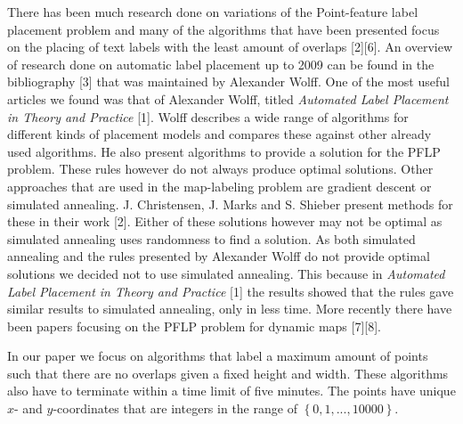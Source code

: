 \documentclass[crop=false,a4paper,oneside,11pt]{standalone}
\begin{document}
 There has been much research done on variations of the Point-feature label placement problem and many of the algorithms that have been presented focus on the placing of text labels with the least amount of overlaps [2][6]. An overview of research done on automatic label placement up to 2009 can be found in the bibliography [3] that was maintained by Alexander Wolff. One of the most useful articles we found was that of Alexander Wolff, titled \emph{Automated Label Placement in Theory and Practice} [1]. Wolff describes a wide range of algorithms for different kinds of placement models and compares these against other already used algorithms. He also present algorithms to provide a solution for the PFLP problem. These rules however do not always produce optimal solutions. Other approaches that are used in the map-labeling problem are gradient descent or simulated annealing. J. Christensen, J. Marks and S. Shieber present methods for these in their work [2]. Either of these solutions however may not be optimal as simulated annealing uses randomness to find a solution. As both simulated annealing and the rules presented by Alexander Wolff do not provide optimal solutions we decided not to use simulated annealing. This because in \emph{Automated Label Placement in Theory and Practice} [1] the results showed that the rules gave similar results to simulated annealing, only in less time.  More recently there have been papers focusing on the PFLP problem for dynamic maps [7][8].

 In our paper we focus on algorithms that label a maximum amount of points such that there are no overlaps given a fixed height and width. These algorithms also have to terminate within a time limit of five minutes. The points have unique $x$- and $y$-coordinates that are integers in the range of $\left\{0,1,...,10000\right\}$.
\end{document}
